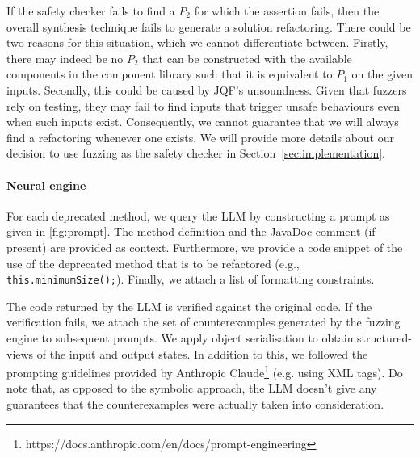 \documentclass[conference]{IEEEtran}
\begin{document}
If the safety checker fails to find a $P_2$ for which the assertion fails, then the overall synthesis technique fails to generate a solution refactoring.
There could be two reasons for this situation, which we cannot differentiate between.
Firstly, there may indeed be no $P_2$ that can be constructed with the available components in the component library such that
it is equivalent to $P_1$ on the given inputs. Secondly, this could be caused by JQF's unsoundness.
Given that fuzzers rely on testing, they may fail to find inputs that trigger unsafe behaviours even when such inputs exist.
Consequently, we cannot guarantee that we will always find a refactoring whenever one exists. We will provide more details about our decision to use fuzzing as the safety checker in 
Section~\ref{sec:implementation}.


\paragraph{Neural engine}
%
For each deprecated method, we query the LLM by constructing a
prompt as given in \autoref{fig:prompt}.  The method definition and the
JavaDoc comment (if present) are provided as context.  Furthermore, we
provide a code snippet of the use of the deprecated method that is to be
refactored (e.g., \lstinline{this.minimumSize();}).  Finally, we attach a
list of formatting constraints.

The code returned by the LLM is verified against the original code. 
If the verification fails, we attach the set of counterexamples generated by the fuzzing
engine to subsequent prompts. We apply object serialisation to obtain structured-views of the input and output states.
In addition to this, we followed the prompting guidelines provided by Anthropic Claude\footnote{https://docs.anthropic.com/en/docs/prompt-engineering} (e.g. using XML tags).
Do note that, as opposed to the symbolic approach, the LLM doesn't give any guarantees that the counterexamples were actually taken into consideration.
\end{document}
